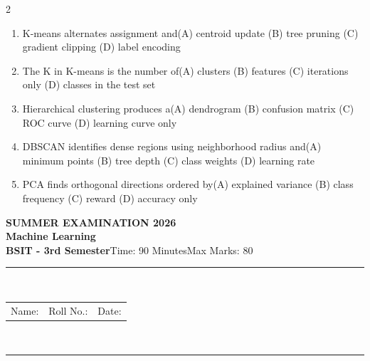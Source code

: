 \documentclass[a4paper]{article}
\makeatletter
\newcommand{\examheader}{%
\begin{center}\textbf{\large SUMMER EXAMINATION 2026}\\[-1pt]
\textbf{\normalsize Machine Learning}\\[-1pt]
\textbf{BSIT - 3rd Semester}\quad Time: 90 Minutes\quad Max Marks: 80\\[-1pt]
\textcolor{black!65}{\rule{\linewidth}{0.45pt}}\\[-2pt]
\begin{tabularx}{\linewidth}{@{}X X X@{}}Name: \hrulefill & Roll No.: \hrulefill & Date: \hrulefill\end{tabularx}\\[-1pt]
\textcolor{black!65}{\rule{\linewidth}{0.45pt}}\end{center}}
\makeatother
\begin{document}
\begin{multicols*}{2}
\begin{enumerate}
\item K-means alternates assignment and\newline\hspace*{0.6em}(A) centroid update \quad (B) tree pruning \newline\hspace*{0.6em}(C) gradient clipping \quad (D) label encoding
\item The K in K-means is the number of\newline\hspace*{0.6em}(A) clusters \quad (B) features \newline\hspace*{0.6em}(C) iterations only \quad (D) classes in the test set
\item Hierarchical clustering produces a\newline\hspace*{0.6em}(A) dendrogram \quad (B) confusion matrix \newline\hspace*{0.6em}(C) ROC curve \quad (D) learning curve only
\item DBSCAN identifies dense regions using neighborhood radius and\newline\hspace*{0.6em}(A) minimum points \quad (B) tree depth \newline\hspace*{0.6em}(C) class weights \quad (D) learning rate
\item PCA finds orthogonal directions ordered by\newline\hspace*{0.6em}(A) explained variance \quad (B) class frequency \newline\hspace*{0.6em}(C) reward \quad (D) accuracy only
\end{enumerate}
\end{multicols*}
\newpage
\examheader
\raggedcolumns
\end{document}
